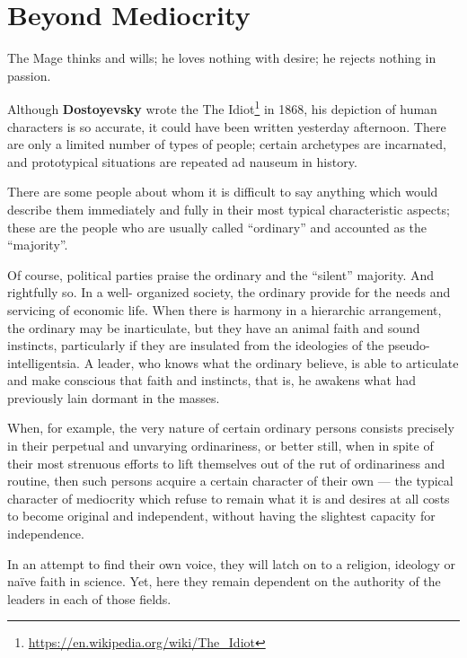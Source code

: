\section{Beyond Mediocrity}

\begin{quotex}
The Mage thinks and wills; he loves nothing with desire; he rejects nothing in passion. 
\end{quotex}

Although \textbf{Dostoyevsky} wrote the The Idiot\footnote{\url{https://en.wikipedia.org/wiki/The\_Idiot}} in 1868, his depiction of human characters is so accurate, it could have been written yesterday afternoon. There are only a limited number of types of people; certain archetypes are incarnated, and prototypical situations are repeated ad nauseum in history.

\begin{quotex}
There are some people about whom it is difficult to say anything which would describe them immediately and fully in their most typical characteristic aspects; these are the people who are usually called ``ordinary'' and accounted as the ``majority''.
\end{quotex}


Of course, political parties praise the ordinary and the ``silent'' majority. And rightfully so. In a well- organized society, the ordinary provide for the needs and servicing of economic life. When there is harmony in a hierarchic arrangement, the ordinary may be inarticulate, but they have an animal faith and sound instincts, particularly if they are insulated from the ideologies of the pseudo-intelligentsia. A leader, who knows what the ordinary believe, is able to articulate and make conscious that faith and instincts, that is, he awakens what had previously lain dormant in the masses.

\begin{quotex}
When, for example, the very nature of certain ordinary persons consists precisely in their perpetual and unvarying ordinariness, or better still, when in spite of their most strenuous efforts to lift themselves out of the rut of ordinariness and routine, then such persons acquire a certain character of their own --- the typical character of mediocrity which refuse to remain what it is and desires at all costs to become original and independent, without having the slightest capacity for independence.
\end{quotex}


In an attempt to find their own voice, they will latch on to a religion, ideology or naïve faith in science. Yet, here they remain dependent on the authority of the leaders in each of those fields.

